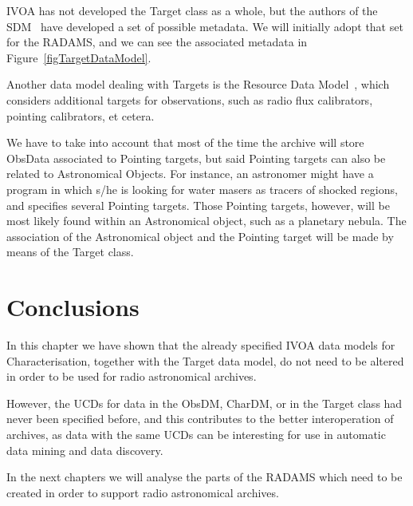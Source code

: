 		IVOA has not developed the Target class as a whole, but the
		authors of the SDM~\cite{McDowell:2006fk} have developed a
		set of possible metadata. We will initially adopt that set
		for the RADAMS, and we can see the associated metadata in
		Figure~\ref{figTargetDataModel}.
		
		Another data model dealing with Targets is the Resource
		Data Model~\cite{2004ASPC..314..273H}, which considers
		additional targets for observations, such as radio flux
		calibrators, pointing calibrators, et cetera.
		
		We have to take into account that most of the time the
		archive will store ObsData associated to Pointing targets,
		but said Pointing targets can also be related to
		Astronomical Objects.
		For instance, an astronomer might have a program in which
		s/he is looking for water masers as tracers of shocked
		regions, and specifies several Pointing targets. Those
		Pointing targets, however, will be most likely found within
		an Astronomical object, such as a planetary nebula. The
		association of the Astronomical object and the Pointing
		target will be made by means of the Target class.
		
	
	
	\section{Conclusions} %
	\label{sec:radams_cha_conclusions}
		
		In this chapter we have shown that the already specified
		IVOA data models for Characterisation, together with the
		Target data model, do not need to be altered in order to
		be used for radio astronomical archives.
		
		However, the UCDs for data in the ObsDM, CharDM, or in the
		Target class had never been specified before, and this
		contributes to the better interoperation of archives, as
		data with the same UCDs can be interesting for use in
		automatic data mining and data discovery.
		
		In the next chapters we will analyse the parts of the RADAMS
		which need to be created in order to support radio
		astronomical archives.
		
	
